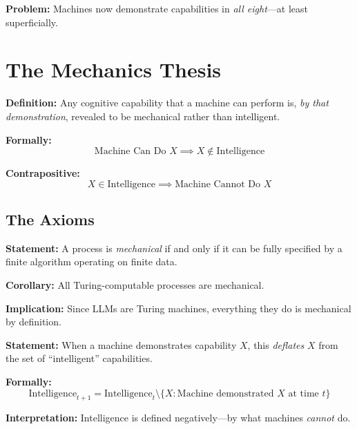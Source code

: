\textbf{Problem:} Machines now demonstrate capabilities in \textit{all eight}---at least superficially.


\section{The Mechanics Thesis}
\label{sec:hi-mechanics}

\begin{tcolorbox}[colback=red!5!white, colframe=red!75!black,
    title=The Mechanics Thesis]
\textbf{Definition:} Any cognitive capability that a machine can perform is, \textit{by that demonstration}, revealed to be mechanical rather than intelligent.

\textbf{Formally:}
\begin{equation}
\text{Machine Can Do } X \implies X \notin \text{Intelligence}
\end{equation}

\textbf{Contrapositive:}
\begin{equation}
X \in \text{Intelligence} \implies \text{Machine Cannot Do } X
\end{equation}
\end{tcolorbox}

\subsection{The Axioms}

\begin{tcolorbox}[colback=gray!5!white, colframe=gray!75!black,
    title=Axiom UNMAPPED_HI-1: Mechanizability Criterion]
\textbf{Statement:} A process is \textit{mechanical} if and only if it can be fully specified by a finite algorithm operating on finite data.

\textbf{Corollary:} All Turing-computable processes are mechanical.

\textbf{Implication:} Since LLMs are Turing machines, everything they do is mechanical by definition.
\end{tcolorbox}

\begin{tcolorbox}[colback=gray!5!white, colframe=gray!75!black,
    title=Axiom UNMAPPED_HI-2: Demonstration Deflates]
\textbf{Statement:} When a machine demonstrates capability $X$, this \textit{deflates} $X$ from the set of ``intelligent'' capabilities.

\textbf{Formally:}
\begin{equation}
\text{Intelligence}_{t+1} = \text{Intelligence}_t \setminus \{X : \text{Machine demonstrated } X \text{ at time } t\}
\end{equation}

\textbf{Interpretation:} Intelligence is defined negatively---by what machines \textit{cannot} do.
\end{tcolorbox}

